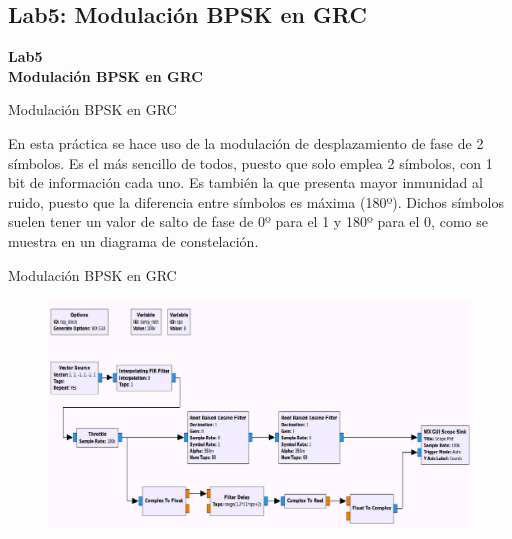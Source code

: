 \subsection{Lab5: Modulación BPSK en GRC}

\begin{frame}{}


\bfseries{\textrm{\LARGE Lab5\\ \Large Modulación BPSK en GRC}}
\raggedright
\end{frame}


\begin{frame}{Modulación BPSK en GRC}




En esta práctica se hace uso de la modulación de desplazamiento de fase de 2 símbolos. Es el más sencillo de todos, puesto que solo emplea 2 símbolos, con 1 bit de información cada uno. Es también la que presenta mayor inmunidad al ruido, puesto que la diferencia entre símbolos es máxima (180º). Dichos símbolos suelen tener un valor de salto de fase de 0º para el 1 y 180º para el 0, como se muestra en un diagrama de constelación.
  

\end{frame}

\begin{frame}{Modulación BPSK en GRC}

\begin{figure}
  \centering
   \includegraphics[width=\textwidth]{parte1/lab5/pdf/lab5_1.pdf}
  \end{figure}
  
\end{frame}

